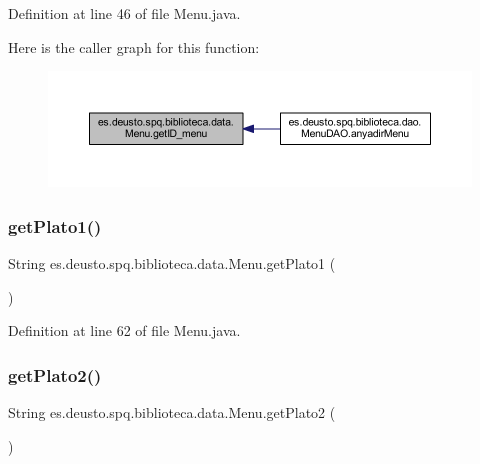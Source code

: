 Definition at line 46 of file Menu.\+java.

Here is the caller graph for this function\+:
\nopagebreak
\begin{figure}[H]
\begin{center}
\leavevmode
\includegraphics[width=350pt]{classes_1_1deusto_1_1spq_1_1biblioteca_1_1data_1_1_menu_ad0546e8f7f5a022b6de889d97a0bb2bb_icgraph}
\end{center}
\end{figure}
\mbox{\label{classes_1_1deusto_1_1spq_1_1biblioteca_1_1data_1_1_menu_a6321a079ece24e42ed984989a39c3b40}} 
\subsubsection{\texorpdfstring{get\+Plato1()}{getPlato1()}}
{\footnotesize\ttfamily String es.\+deusto.\+spq.\+biblioteca.\+data.\+Menu.\+get\+Plato1 (\begin{DoxyParamCaption}{ }\end{DoxyParamCaption})}



Definition at line 62 of file Menu.\+java.

\mbox{\label{classes_1_1deusto_1_1spq_1_1biblioteca_1_1data_1_1_menu_aa8e902ae29177a34bc606f240ab43000}} 
\subsubsection{\texorpdfstring{get\+Plato2()}{getPlato2()}}
{\footnotesize\ttfamily String es.\+deusto.\+spq.\+biblioteca.\+data.\+Menu.\+get\+Plato2 (\begin{DoxyParamCaption}{ }\end{DoxyParamCaption})}



